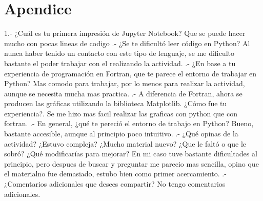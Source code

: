 \documentclass{article}
\begin{document}
\section{Apendice}
1.- ¿Cuál es tu primera impresión de Jupyter Notebook?
\newline
Que se puede hacer mucho con pocas lineas de codigo
.- ¿Se te dificultó leer código en Python?
\newline
Al nunca haber tenido un contacto con este tipo de lenguaje, se me dificulto bastante el poder trabajar con el realizando la actividad.
.-  ¿En base a tu experiencia de programación en Fortran, que te parece el entorno de trabajar en Python?
\newline
Mas comodo para trabajar, por lo menos para realizar la actividad, aunque se necesita mucha mas practica.
.- A diferencia de Fortran, ahora se producen las gráficas utilizando la biblioteca Matplotlib. ¿Cómo fue tu experiencia?.
\newline
Se me hizo mas facil realizar las graficas con python que con fortran.
.- En general, ¿qué te pereció el entorno de trabajo en Python?
Bueno, bastante accesible, aunque al principio poco intuitivo.
.- ¿Qué opinas de la actividad? ¿Estuvo compleja? ¿Mucho material nuevo? ¿Que le faltó o que le sobró? ¿Qué modificarías para mejorar?
\newline
En mi caso tuve bastante dificultades al principio, pero despues de buscar y preguntar me parecio mas sencilla, opino que el materialno fue demasiado, estubo bien como primer acercamiento.
.- ¿Comentarios adicionales que desees compartir?
\newline
No tengo comentarios adicionales.
\end{document}

